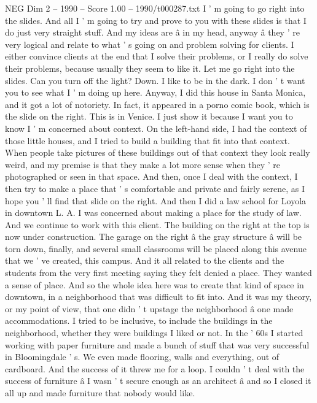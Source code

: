 \begin{textsample}{NEG Dim 2 – 1990 – Score 1.00 – 1990/t000287.txt}  \label{ex:f2_neg_001}
I ' m going to go right into the slides.
And all I ' m going to try and prove to you with these slides is that I do just very straight stuff.
And my ideas are â in my head, anyway â they ' re very logical and relate to what ' s going on and problem solving for clients.
I either convince clients at the end that I solve their problems, or I really do solve their problems, because usually they seem to like it.
Let me go right into the slides.
Can you turn off the light?
Down.
I like to be in the dark.
I don ' t want you to see what I ' m doing up here.
Anyway, I did this house in Santa Monica, and it got a lot of notoriety.
In fact, it appeared in a porno comic book, which is the slide on the right.
This is in Venice.
I just show it because I want you to know I ' m concerned about context.
On the left-hand side, I had the context of those little houses, and I tried to build a building that fit into that context.
When people take pictures of these buildings out of that context they look really weird, and my premise is that they make a lot more sense when they ' re photographed or seen in that space.
And then, once I deal with the context, I then try to make a place that ' s comfortable and private and fairly serene, as I hope you ' ll find that slide on the right.
And then I did a law school for Loyola in downtown L.
A.
I was concerned about making a place for the study of law.
And we continue to work with this client.
The building on the right at the top is now under construction.
The garage on the right â the gray structure â will be torn down, finally, and several small classrooms will be placed along this avenue that we ' ve created, this campus.
And it all related to the clients and the students from the very first meeting saying they felt denied a place.
They wanted a sense of place.
And so the whole idea here was to create that kind of space in downtown, in a neighborhood that was difficult to fit into.
And it was my theory, or my point of view, that one didn ' t upstage the neighborhood â one made accommodations.
I tried to be inclusive, to include the buildings in the neighborhood, whether they were buildings I liked or not.
In the ' 60s I started working with paper furniture and made a bunch of stuff that was very successful in Bloomingdale ' s.
We even made flooring, walls and everything, out of cardboard.
And the success of it threw me for a loop.
I couldn ' t deal with the success of furniture â I wasn ' t secure enough as an architect â and so I closed it all up and made furniture that nobody would like.

\end{textsample}
